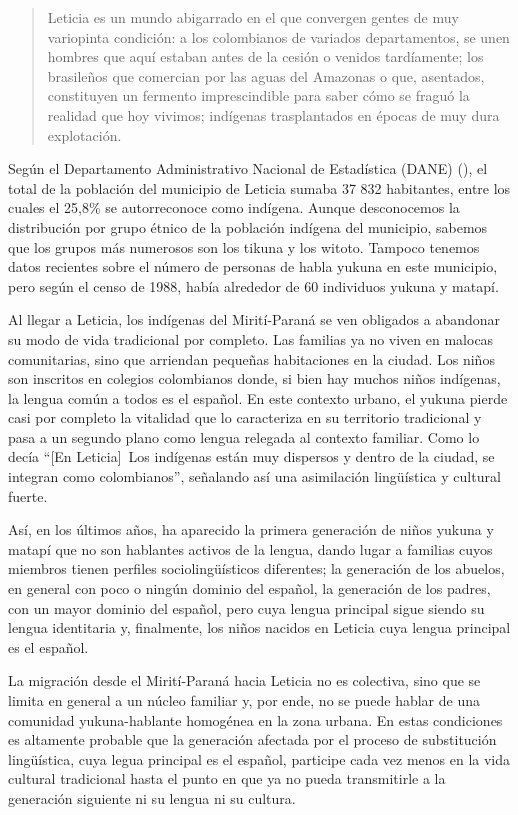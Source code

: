 \documentclass[output=paper]{langscibook}
\begin{document}
\begin{quote}
Leticia es un mundo abigarrado en el que convergen gentes de muy variopinta condición: a los colombianos de variados departamentos, se unen hombres que aquí estaban antes de la cesión o venidos tardíamente; los brasileños que comercian por las aguas del Amazonas o que, asentados, constituyen un fermento imprescindible para saber cómo se fraguó la realidad que hoy vivimos; indígenas trasplantados en épocas de muy dura explotación.
\end{quote}

Según el Departamento Administrativo Nacional de Estadística (DANE) (\citeyear{DANE2005}), el total de la población del municipio de Leticia sumaba 37 832 habitantes, entre los cuales el 25,8\% se autorreconoce como indígena. Aunque desconocemos la distribución por grupo étnico de la población indígena del municipio, sabemos que los grupos más numerosos son los tikuna y los witoto.  Tampoco tenemos datos recientes sobre el número de personas de habla yukuna en este municipio, pero según el censo de 1988, había alrededor de 60 individuos yukuna y matapí.

Al llegar a Leticia, los indígenas del Mirití-Paraná se ven obligados a abandonar su modo de vida tradicional por completo. Las familias ya no viven en malocas comunitarias, sino que arriendan pequeñas habitaciones en la ciudad. Los niños son inscritos en colegios colombianos donde, si bien hay muchos niños indígenas, la lengua común a todos es el español. En este contexto urbano, el yukuna pierde casi por completo la vitalidad que lo caracteriza en su territorio tradicional y pasa a un segundo plano como lengua relegada al contexto familiar. Como lo decía \citet[32]{Alvar1977} “[En Leticia]~Los indígenas están muy dispersos y dentro de la ciudad, se integran como colombianos”, señalando así una asimilación lingüística y cultural fuerte.

Así, en los últimos años, ha aparecido la primera generación de niños yukuna y matapí que no son hablantes activos de la lengua, dando lugar a familias cuyos miembros tienen perfiles sociolingüísticos diferentes; la generación de los abuelos, en general con poco o ningún dominio del español, la generación de los padres, con un mayor dominio del español, pero cuya lengua principal sigue siendo su lengua identitaria y, finalmente, los niños nacidos en Leticia cuya lengua principal es el español. 

La migración desde el Mirití-Paraná hacia Leticia no es colectiva, sino que se limita en general a un núcleo familiar y, por ende, no se puede hablar de una comunidad yukuna-hablante homogénea en la zona urbana.  En estas condiciones es altamente probable que la generación afectada por el proceso de substitución lingüística, cuya legua principal es el español, participe cada vez menos en la vida cultural tradicional hasta el punto en que ya no pueda transmitirle a la generación siguiente ni su lengua ni su cultura. 
\end{document}
